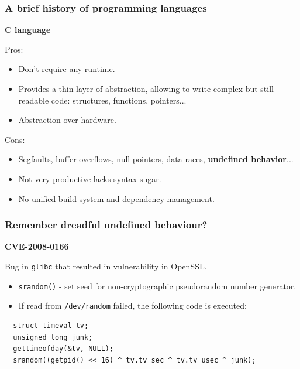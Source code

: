 \documentclass[aspectratio=1610,t]{beamer}
\begin{document}

\begin{frame}
\frametitle{A brief history of programming languages}
\textbf{C language}

Pros:
\begin{itemize}
\item Don't require any runtime.
\item Provides a thin layer of abstraction, allowing to write complex but still readable code: structures, functions, pointers...
\item Abstraction over hardware.
\end{itemize}

Cons:
\begin{itemize}
\item Segfaults, buffer overflows, null pointers, data races, \textbf{undefined behavior}...
\item Not very productive lacks syntax sugar.
\item No unified build system and dependency management.
\end{itemize}
\end{frame}


\begin{frame}[fragile]
\frametitle{Remember dreadful undefined behaviour?}
\textbf{CVE-2008-0166}

Bug in \texttt{glibc} that resulted in vulnerability in OpenSSL.

\begin{itemize}
    \item \texttt{srandom()} - set seed for non-cryptographic pseudorandom number generator.
    \item If read from \texttt{/dev/random} failed, the following code is executed:
\end{itemize}

\begin{verbatim}
  struct timeval tv;
  unsigned long junk;
  gettimeofday(&tv, NULL);
  srandom((getpid() << 16) ^ tv.tv_sec ^ tv.tv_usec ^ junk);
\end{verbatim}

\end{frame}

\end{document}
